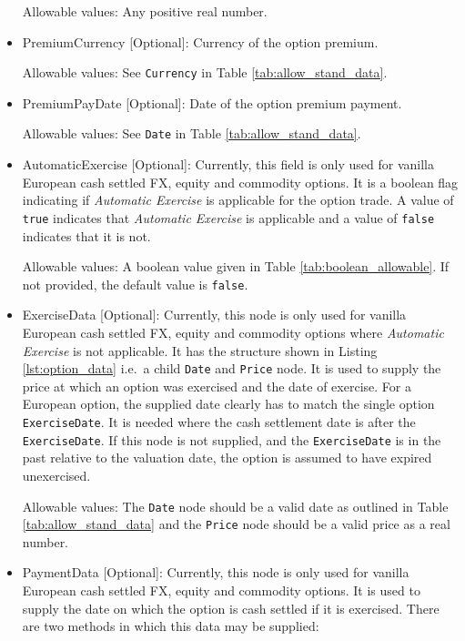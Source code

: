 \begin{itemize}
Allowable values:  Any positive real number.

\item PremiumCurrency [Optional]: Currency of the option premium.

Allowable values:  See \lstinline!Currency! in Table \ref{tab:allow_stand_data}.

\item PremiumPayDate [Optional]: Date of the option premium payment.

Allowable values:  See \lstinline!Date! in Table \ref{tab:allow_stand_data}.

\item AutomaticExercise [Optional]: Currently, this field is only used for vanilla European cash settled FX, equity and commodity options. It is a boolean flag indicating if \textit{Automatic Exercise} is applicable for the option trade. A value of \lstinline!true! indicates that \textit{Automatic Exercise} is applicable and a value of \lstinline!false! indicates that it is not.

Allowable values: A boolean value given in Table \ref{tab:boolean_allowable}. If not provided, the default value is \lstinline!false!.

\item ExerciseData [Optional]: Currently, this node is only used for vanilla European cash settled FX, equity and commodity options where \textit{Automatic Exercise} is not applicable. It has the structure shown in Listing \ref{lst:option_data} i.e.\ a child \lstinline!Date! and \lstinline!Price! node. It is used to supply the price at which an option was exercised and the date of exercise. For a European option, the supplied date clearly has to match the single option \lstinline!ExerciseDate!. It is needed where the cash settlement date is after the \lstinline!ExerciseDate!. If this node is not supplied, and the \lstinline!ExerciseDate! is in the past relative to the valuation date, the option is assumed to have expired unexercised.

Allowable values: The \lstinline!Date! node should be a valid date as outlined in Table \ref{tab:allow_stand_data} and the \lstinline!Price! node should be a valid price as a real number.

\item PaymentData [Optional]: Currently, this node is only used for vanilla European cash settled FX, equity and commodity options. It is used to supply the date on which the option is cash settled if it is exercised. There are two methods in which this data may be supplied:


\end{itemize}
